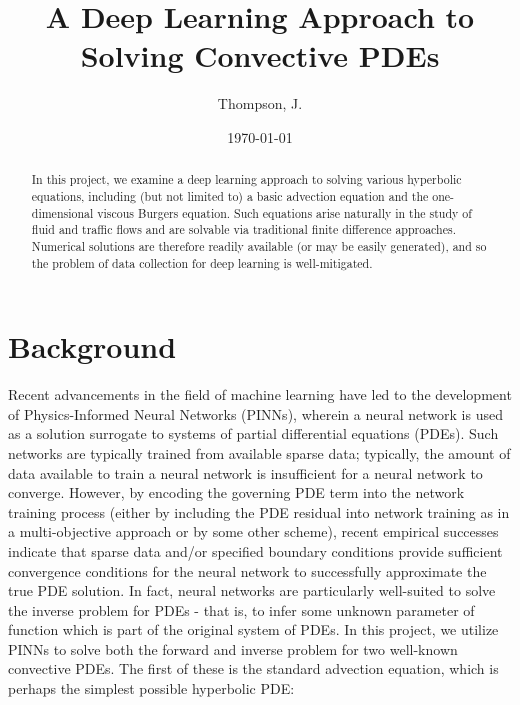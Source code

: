 \documentclass[letterpaper,11pt]{article}
\begin{document}
    \title{
        A Deep Learning Approach to Solving Convective PDEs\\
    }
    \author{%
        Thompson, J.
    }
    \date{\today}
    \maketitle

    \begin{abstract}
        In this project, we examine a deep learning approach to solving various hyperbolic equations, including 
        (but not limited to) a basic advection equation and the one-dimensional viscous Burgers equation.
        Such equations arise naturally in the study of fluid and traffic flows and are solvable via traditional 
        finite difference approaches. Numerical solutions are therefore readily available (or may be easily generated),
        and so the problem of data collection for deep learning is well-mitigated.
    \end{abstract}


    \section{Background}\label{sec:background}
    Recent advancements in the field of machine learning have led to the development of Physics-Informed Neural 
    Networks (PINNs), wherein a neural network is used as a solution surrogate to systems of partial differential 
    equations (PDEs). Such networks are typically trained from available sparse data; typically, the amount of data
    available to train a neural network is insufficient for a neural network to converge. However, by encoding the 
    governing PDE term into the network training process (either by including the PDE residual into network training as
    in a multi-objective approach or by some other scheme), recent empirical successes indicate that
    sparse data and/or specified boundary conditions provide sufficient convergence conditions for the neural network to
    successfully approximate the true PDE solution.\cite{raissi_physics-informed_2019} In fact, neural networks are 
    particularly well-suited to solve the inverse problem for PDEs - that is, to infer some unknown parameter of 
    function which is part of the original system of PDEs.\cite{lu_deepxde_2021} In this project, we utilize PINNs to 
    solve both the forward and inverse problem for two well-known convective PDEs. The first of these is the standard 
    advection equation, which is perhaps the simplest possible hyperbolic PDE:
\end{document}
